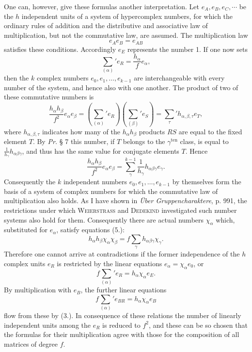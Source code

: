 \documentclass[11pt]{article}
\newcommand{\ten}{\mathrm{ten}}
\begin{document}
One can, however, give these formulas another interpretation. Let $e_A,e_B,e_C,\cdots$ be the $h$ independent units of a system of hypercomplex numbers, for which the ordinary rules of addition and the distributive and associative law of multiplication, but not the commutative law, are assumed. The multiplication law
\begin{equation}\tag{3.}
e_Ae_B=e_{AB}
\end{equation}
satisfies these conditions. Accordingly $e_E$ represents the number 1. If one now sets
\begin{equation}\tag{4.}
\sum_{(\alpha)}'e_R=\frac{h_\alpha}{f}e_\alpha,
\end{equation}
then the $k$ complex numbers $e_0,e_1,\ldots,e_{k-1}$ are interchangeable with every number of the system, and hence also with one another. The product of two of these commutative numbers is
\[
\frac{h_\alpha h_\beta}{f^2}e_\alpha e_\beta
=\left(\sum_{(\alpha)}'e_R\right)\left(\sum_{(\beta)}'e_S\right)
=\sum_\tau' h_{\alpha,\beta,\tau} e_T,
\]
where $h_{\alpha,\beta,\tau}$ indicates how many of the $h_\alpha h_\beta$ products $RS$ are equal to the fixed element $T$. By \emph{Pr.} § 7 this number, if $T$ belongs to the $\gamma^{\ten}$ class, is equal to $\frac{1}{h_\gamma}h_{\alpha\beta\gamma}$, and thus has the same value for conjugate elements $T$. Hence
\begin{equation}\tag{5.}
\frac{h_\alpha h_\beta}{f^2}e_\alpha e_\beta
=\sum_\gamma^{k-1}\frac{1}{h_\gamma}h_{\alpha\beta\gamma}e_\gamma.
\end{equation}
Consequently the $k$ independent numbers $e_0,e_1,\ldots,e_{k-1}$ by themselves form the basis of a system of complex numbers for which the commutative law of multiplication also holds. As I have shown in \emph{Über Gruppencharaktere}, p. 991, the restrictions under which \textsc{Weierstrass} and \textsc{Dedekind} investigated such number systems also hold for them. Consequently there are actual numbers $\chi_\alpha$ which, substituted for $e_\alpha$, satisfy equations (5.):
\begin{equation}\tag{6.}
h_\alpha h_\beta\chi_\alpha\chi_\beta=f\sum_\gamma h_{\alpha\beta\gamma}\chi_\gamma.
\end{equation}
Therefore one cannot arrive at contradictions if the former independence of the $h$ complex units $e_R$ is restricted by the linear equations $e_\alpha=\chi_\alpha e_0$, or
\begin{equation}\tag{7.}
f\sum_{(\alpha)}'e_R=h_\alpha\chi_\alpha e_E.
\end{equation}
By multiplication with $e_B$, the further linear equations
\begin{equation}\tag{8.}
f\sum_{(\alpha)}'e_{BR}=h_\alpha\chi_\alpha e_B
\end{equation}
flow from these by (3.). In consequence of these relations the number of linearly independent units among the $e_R$ is reduced to $f^2$, and these can be so chosen that the formulas for their multiplication agree with those for the composition of all matrices of degree $f$.
\end{document}
